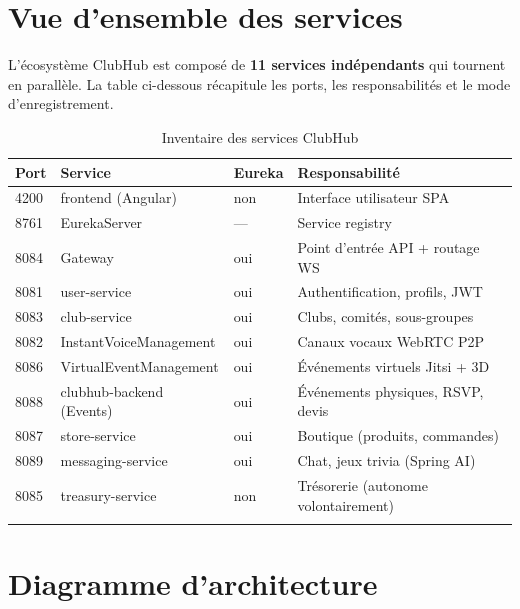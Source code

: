 \documentclass[11pt,a4paper]{report}
\begin{document}
\section{Vue d'ensemble des services}

L'écosystème ClubHub est composé de \textbf{11 services indépendants} qui tournent
en parallèle. La table ci-dessous récapitule les ports, les responsabilités et
le mode d'enregistrement.

\begin{longtable}{lllp{6cm}}
\toprule
\textbf{Port} & \textbf{Service} & \textbf{Eureka} & \textbf{Responsabilité} \\
\midrule \endhead
4200 & frontend (Angular)         & non  & Interface utilisateur SPA \\
8761 & EurekaServer               & —    & Service registry \\
8084 & Gateway                    & oui  & Point d'entrée API + routage WS \\
8081 & user-service               & oui  & Authentification, profils, JWT \\
8083 & club-service               & oui  & Clubs, comités, sous-groupes \\
8082 & InstantVoiceManagement     & oui  & Canaux vocaux WebRTC P2P \\
8086 & VirtualEventManagement     & oui  & Événements virtuels Jitsi + 3D \\
8088 & clubhub-backend (Events)   & oui  & Événements physiques, RSVP, devis \\
8087 & store-service              & oui  & Boutique (produits, commandes) \\
8089 & messaging-service          & oui  & Chat, jeux trivia (Spring AI) \\
8085 & treasury-service           & non  & Trésorerie (autonome volontairement) \\
\bottomrule
\caption{Inventaire des services ClubHub}
\end{longtable}

\section{Diagramme d'architecture}
\end{document}
